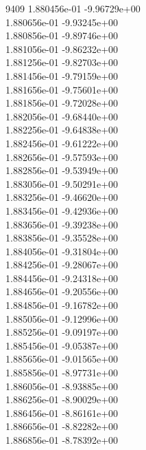 9409	1.880456e-01	-9.96729e+00	\\ 	1.880656e-01	-9.93245e+00	\\ 	1.880856e-01	-9.89746e+00	\\ 	1.881056e-01	-9.86232e+00	\\ 	1.881256e-01	-9.82703e+00	\\ 	1.881456e-01	-9.79159e+00	\\ 	1.881656e-01	-9.75601e+00	\\ 	1.881856e-01	-9.72028e+00	\\ 	1.882056e-01	-9.68440e+00	\\ 	1.882256e-01	-9.64838e+00	\\ 	1.882456e-01	-9.61222e+00	\\ 	1.882656e-01	-9.57593e+00	\\ 	1.882856e-01	-9.53949e+00	\\ 	1.883056e-01	-9.50291e+00	\\ 	1.883256e-01	-9.46620e+00	\\ 	1.883456e-01	-9.42936e+00	\\ 	1.883656e-01	-9.39238e+00	\\ 	1.883856e-01	-9.35528e+00	\\ 	1.884056e-01	-9.31804e+00	\\ 	1.884256e-01	-9.28067e+00	\\ 	1.884456e-01	-9.24318e+00	\\ 	1.884656e-01	-9.20556e+00	\\ 	1.884856e-01	-9.16782e+00	\\ 	1.885056e-01	-9.12996e+00	\\ 	1.885256e-01	-9.09197e+00	\\ 	1.885456e-01	-9.05387e+00	\\ 	1.885656e-01	-9.01565e+00	\\ 	1.885856e-01	-8.97731e+00	\\ 	1.886056e-01	-8.93885e+00	\\ 	1.886256e-01	-8.90029e+00	\\ 	1.886456e-01	-8.86161e+00	\\ 	1.886656e-01	-8.82282e+00	\\ 	1.886856e-01	-8.78392e+00	\\ \hline
